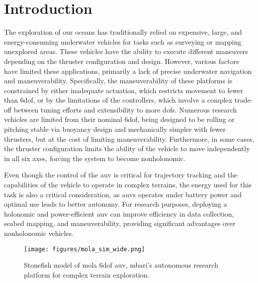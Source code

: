 \section{Introduction}
\label{sec:intro}

\noindent The exploration of our oceans has traditionally relied on expensive, large, and energy-consuming underwater vehicles for tasks such as surveying or mapping unexplored areas. These vehicles have the ability to execute different maneuvers depending on the thruster configuration and design. However, various factors have limited these applications, primarily a lack of precise underwater navigation and maneuverability. Specifically, the maneuverability of these platforms is constrained by either inadequate actuation, which restricts movement to fewer than \ac{6dof}, or by the limitations of the controllers, which involve a complex trade-off between tuning efforts and extensibility to more \acp{dof}. Numerous research vehicles are limited from their nominal \ac{6dof}, being designed to be rolling or pitching stable via buoyancy design and mechanically simpler with fewer thrusters, but at the cost of limiting maneuverability. Furthermore, in some cases, the thruster configuration limits the ability of the vehicle to move independently in all six axes, forcing the system to become nonholonomic.

Even though the control of the \ac{auv} is critical for trajectory tracking and the capabilities of the vehicle to operate in complex terrains, the energy used for this task is also a critical consideration, as \acp{auv} operates under battery power and optimal use leads to better autonomy. For research purposes, deploying a holonomic and power-efficient \ac{auv} can improve efficiency in data collection, seabed mapping, and maneuverability, providing significant advantages over nonholonomic vehicles.

\begin{figure}[t!]
\centering
\texttt{[image: figures/mola\_sim\_wide.png]}%
\caption{Stonefish model of \acs{mola} \acs{6dof} \acs{auv}, \acs{mbari}'s autonomous research platform for complex terrain exploration.}
\label{fig:mola}
\end{figure}


